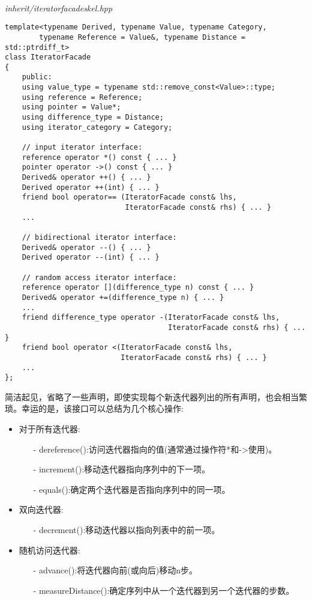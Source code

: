 \hspace*{\fill} \\ %
\noindent
\textit{inherit/iteratorfacadeskel.hpp}
\begin{lstlisting}[style=styleCXX]
template<typename Derived, typename Value, typename Category,
		typename Reference = Value&, typename Distance = std::ptrdiff_t>
class IteratorFacade
{
	public:
	using value_type = typename std::remove_const<Value>::type;
	using reference = Reference;
	using pointer = Value*;
	using difference_type = Distance;
	using iterator_category = Category;
	
	// input iterator interface:
	reference operator *() const { ... }
	pointer operator ->() const { ... }
	Derived& operator ++() { ... }
	Derived operator ++(int) { ... }
	friend bool operator== (IteratorFacade const& lhs,
						    IteratorFacade const& rhs) { ... }
	...
	
	// bidirectional iterator interface:
	Derived& operator --() { ... }
	Derived operator --(int) { ... }
	
	// random access iterator interface:
	reference operator [](difference_type n) const { ... }
	Derived& operator +=(difference_type n) { ... }
	...
	friend difference_type operator -(IteratorFacade const& lhs,
									  IteratorFacade const& rhs) { ... }
	friend bool operator <(IteratorFacade const& lhs,
						   IteratorFacade const& rhs) { ... }
	...
};
\end{lstlisting}

简洁起见，省略了一些声明，即使实现每个新迭代器列出的所有声明，也会相当繁琐。幸运的是，该接口可以总结为几个核心操作:

\begin{itemize}
\item 
对于所有迭代器:
\begin{itemize}
\item [-]
dereference():访问迭代器指向的值(通常通过操作符*和->使用)。

\item [-]
increment():移动迭代器指向序列中的下一项。

\item [-]
equals():确定两个迭代器是否指向序列中的同一项。
\end{itemize}

\item 
双向迭代器:
\begin{itemize}
\item [-]
decrement():移动迭代器以指向列表中的前一项。
\end{itemize}

\item 
随机访问迭代器:
\begin{itemize}
\item [-]
advance():将迭代器向前(或向后)移动n步。

\item [-]
measureDistance():确定序列中从一个迭代器到另一个迭代器的步数。
\end{itemize}
\end{itemize}


